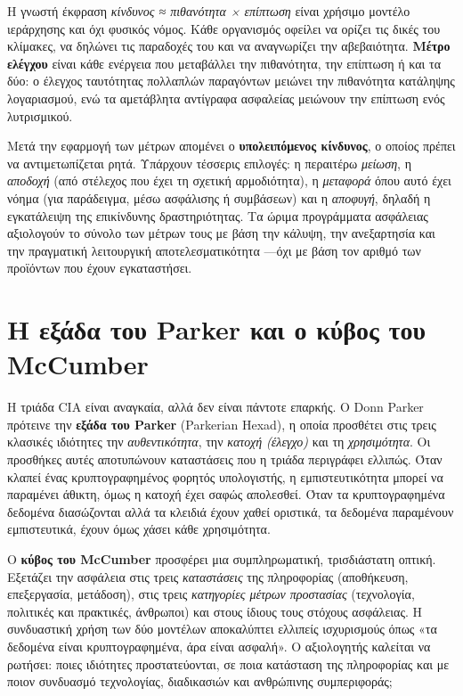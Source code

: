 \documentclass[11pt,openany]{book}
\begin{document}
Η γνωστή έκφραση \emph{κίνδυνος ≈ πιθανότητα × επίπτωση} είναι χρήσιμο μοντέλο ιεράρχησης και όχι φυσικός νόμος. Κάθε οργανισμός οφείλει να ορίζει τις δικές του κλίμακες, να δηλώνει τις παραδοχές του και να αναγνωρίζει την αβεβαιότητα. \textbf{Μέτρο ελέγχου} είναι κάθε ενέργεια που μεταβάλλει την πιθανότητα, την επίπτωση ή και τα δύο: ο έλεγχος ταυτότητας πολλαπλών παραγόντων μειώνει την πιθανότητα κατάληψης λογαριασμού, ενώ τα αμετάβλητα αντίγραφα ασφαλείας μειώνουν την επίπτωση ενός λυτρισμικού.

Μετά την εφαρμογή των μέτρων απομένει ο \textbf{υπολειπόμενος κίνδυνος}, ο οποίος πρέπει να αντιμετωπίζεται ρητά. Υπάρχουν τέσσερις επιλογές: η περαιτέρω \emph{μείωση}, η \emph{αποδοχή} (από στέλεχος που έχει τη σχετική αρμοδιότητα), η \emph{μεταφορά} όπου αυτό έχει νόημα (για παράδειγμα, μέσω ασφάλισης ή συμβάσεων) και η \emph{αποφυγή}, δηλαδή η εγκατάλειψη της επικίνδυνης δραστηριότητας. Τα ώριμα προγράμματα ασφάλειας αξιολογούν το σύνολο των μέτρων τους με βάση την κάλυψη, την ανεξαρτησία και την πραγματική λειτουργική αποτελεσματικότητα —όχι με βάση τον αριθμό των προϊόντων που έχουν εγκαταστήσει.

\section{Η εξάδα του Parker και ο κύβος του McCumber}\label{sec:1.6}
Η τριάδα CIA είναι αναγκαία, αλλά δεν είναι πάντοτε επαρκής. Ο Donn Parker πρότεινε την \textbf{εξάδα του Parker} (Parkerian Hexad), η οποία προσθέτει στις τρεις κλασικές ιδιότητες την \emph{αυθεντικότητα}, την \emph{κατοχή (έλεγχο)} και τη \emph{χρησιμότητα}. Οι προσθήκες αυτές αποτυπώνουν καταστάσεις που η τριάδα περιγράφει ελλιπώς. Όταν κλαπεί ένας κρυπτογραφημένος φορητός υπολογιστής, η εμπιστευτικότητα μπορεί να παραμένει άθικτη, όμως η κατοχή έχει σαφώς απολεσθεί. Όταν τα κρυπτογραφημένα δεδομένα διασώζονται αλλά τα κλειδιά έχουν χαθεί οριστικά, τα δεδομένα παραμένουν εμπιστευτικά, έχουν όμως χάσει κάθε χρησιμότητα.

Ο \textbf{κύβος του McCumber} προσφέρει μια συμπληρωματική, τρισδιάστατη οπτική. Εξετάζει την ασφάλεια στις τρεις \emph{καταστάσεις} της πληροφορίας (αποθήκευση, επεξεργασία, μετάδοση), στις τρεις \emph{κατηγορίες μέτρων προστασίας} (τεχνολογία, πολιτικές και πρακτικές, άνθρωποι) και στους ίδιους τους στόχους ασφάλειας. Η συνδυαστική χρήση των δύο μοντέλων αποκαλύπτει ελλιπείς ισχυρισμούς όπως «τα δεδομένα είναι κρυπτογραφημένα, άρα είναι ασφαλή». Ο αξιολογητής καλείται να ρωτήσει: ποιες ιδιότητες προστατεύονται, σε ποια κατάσταση της πληροφορίας και με ποιον συνδυασμό τεχνολογίας, διαδικασιών και ανθρώπινης συμπεριφοράς;
\end{document}
